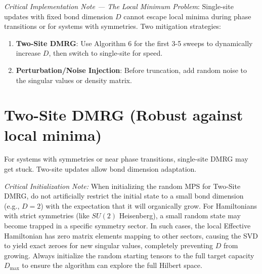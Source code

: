 \documentclass[aps,prb,onecolumn,scriptaddress]{revtex4-2}
\begin{document}
	\textit{Critical Implementation Note — The Local Minimum Problem}:
	Single-site updates with fixed bond dimension $D$ cannot escape local minima during phase transitions or for systems with symmetries. Two mitigation strategies:
	\begin{enumerate}
		\item \textbf{Two-Site DMRG}: Use Algorithm 6 for the first 3-5 sweeps to dynamically increase $D$, then switch to single-site for speed.
		\item \textbf{Perturbation/Noise Injection}: Before truncation, add random noise to the singular values or density matrix.
	\end{enumerate}
	
	\section{Two-Site DMRG (Robust against local minima)}
	
	For systems with symmetries or near phase transitions, single-site DMRG may get stuck. Two-site updates allow bond dimension adaptation.
	
	\textit{Critical Initialization Note:} When initializing the random MPS for Two-Site DMRG, do not artificially restrict the initial state to a small bond dimension (e.g., $D=2$) with the expectation that it will organically grow. For Hamiltonians with strict symmetries (like $SU(2)$ Heisenberg), a small random state may become trapped in a specific symmetry sector. In such cases, the local Effective Hamiltonian has zero matrix elements mapping to other sectors, causing the SVD to yield exact zeroes for new singular values, completely preventing $D$ from growing. Always initialize the random starting tensors to the full target capacity $D_{\max}$ to ensure the algorithm can explore the full Hilbert space.
	
\end{document}
